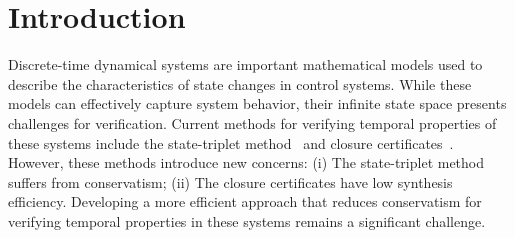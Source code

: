\section{Introduction}

Discrete-time dynamical systems are important mathematical models used to describe the characteristics of state changes in control systems. While these models can effectively capture system behavior, their infinite state space presents challenges for verification. Current methods for verifying temporal properties of these systems include the state-triplet method~\cite{wongpiromsarn2015automata} and closure certificates~\cite{murali2024closure}. However, these methods introduce new concerns: (i) The state-triplet method suffers from conservatism; (ii) The closure certificates have low synthesis efficiency. Developing a more efficient approach that reduces conservatism for verifying temporal properties in these systems remains a significant challenge.


